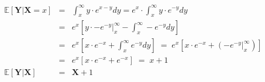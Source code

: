 \documentclass[a4paper, 11pt]{article}
\begin{document}
\begin{equation*}
\begin{array}{rclllll}
\mathds{E}[\mathbf{Y}\vert\mathbf{X}=x] & = & \displaystyle\int_{x}^{\infty} y \cdot e^{x-y}dy = e^{x}\cdot\displaystyle\int_{x}^{\infty}y\cdot e^{-y}dy \\

& = & e^{x}\left[ y \cdot  \left. -e^{-y} \right\vert_{x}^{\infty} - \displaystyle\int_{x}^{\infty} - e^{-y}dy\right] \\

& = & e^{x}\left[ x \cdot e^{-x} + \displaystyle\int_{x}^{\infty} e^{-y}dy\right] \; = \; e^{x}\left[ x \cdot e^{-x} + \left.\left(   -e^{-y}\right\vert_{x}^{\infty}\right)\right]\\

& = & e^{x}\left[ x \cdot e^{-x} + e^{-x}\right] \; = \; x+1\\[25pt] 

\mathds{E}[\mathbf{Y}\vert\mathbf{X}] & = & \mathbf{X} + 1 \\

\end{array}
\end{equation*}
\end{document}
